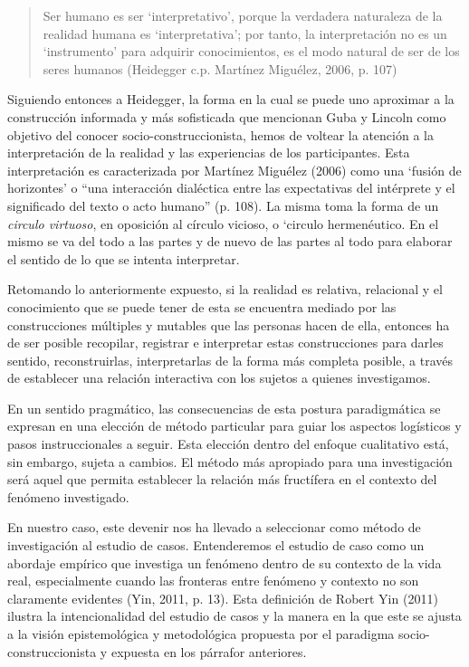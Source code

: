 \begin{quote}
    Ser humano es ser ‘interpretativo’, porque la verdadera naturaleza de la
    realidad humana es ‘interpretativa’; por tanto, la interpretación no es un
    ‘instrumento’ para adquirir conocimientos, es el modo natural de ser de los
    seres humanos (Heidegger c.p. Martínez Miguélez, 2006, p. 107)
\end{quote}

Siguiendo entonces a Heidegger, la forma en la cual se puede uno aproximar a la
construcción informada y más sofisticada que mencionan Guba y Lincoln como
objetivo del conocer socio-construccionista, hemos de voltear la atención a la
interpretación de la realidad y las experiencias de los participantes.
Esta interpretación es caracterizada por Martínez Miguélez (2006) como una
‘fusión de horizontes’ o “una interacción dialéctica entre las expectativas del
intérprete y el significado del texto o acto humano” (p. 108).
La misma toma la forma de un \emph{circulo virtuoso}, en oposición al círculo
vicioso,
o ‘circulo hermenéutico.
En el mismo se va del todo a las partes y de nuevo de las partes al todo para
elaborar el sentido de lo que se intenta interpretar.

Retomando lo anteriormente expuesto, si la realidad es relativa, relacional y el
conocimiento que se puede tener de esta se encuentra mediado por las
construcciones múltiples y mutables que las personas hacen de ella, entonces ha
de ser posible recopilar, registrar e interpretar estas construcciones para
darles sentido, reconstruirlas, interpretarlas de la forma más completa posible,
a través de establecer una relación interactiva con los sujetos a quienes
investigamos.

En un sentido pragmático, las consecuencias de esta postura paradigmática se
expresan en una elección de método particular para guiar los aspectos logísticos
y pasos instruccionales a seguir.
Esta elección dentro del enfoque cualitativo está, sin embargo, sujeta a
cambios.
El método más apropiado para una investigación será aquel que permita establecer
la relación más fructífera en el contexto del fenómeno investigado.

En nuestro caso, este devenir nos ha llevado a seleccionar como método de
investigación al estudio de casos.
Entenderemos el estudio de caso como un abordaje empírico que investiga un
fenómeno dentro de su contexto de la vida real, especialmente cuando las
fronteras entre fenómeno y contexto no son claramente evidentes (Yin, 2011, p.
13).
Esta definición de Robert Yin (2011) ilustra la intencionalidad del estudio de
casos y la manera en la que este se ajusta a la visión epistemológica y
metodológica propuesta por el paradigma socio-construccionista y expuesta en los
párrafor anteriores.

